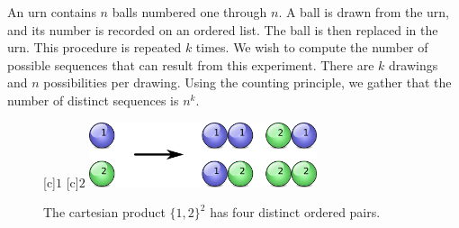 \begin{example}
An urn contains $n$ balls numbered one through $n$.
A ball is drawn from the urn, and its number is recorded on an ordered list.
The ball is then replaced in the urn.
This procedure is repeated $k$ times.
We wish to compute the number of possible sequences that can result from this experiment.
There are $k$ drawings and $n$ possibilities per drawing.
Using the counting principle, we gather that the number of distinct sequences is $n^k$.

\begin{figure}[htb!]
\begin{center}
\begin{psfrags}
[c]{$1$}
[c]{$2$}
\includegraphics[height=1.91cm]{Figures/4Chapter/sequences}
\end{psfrags}
\caption{The cartesian product $\{ 1, 2 \}^2$ has four distinct ordered pairs.}
\label{figure:Sequences}
\end{center}
\end{figure}
\end{example}

